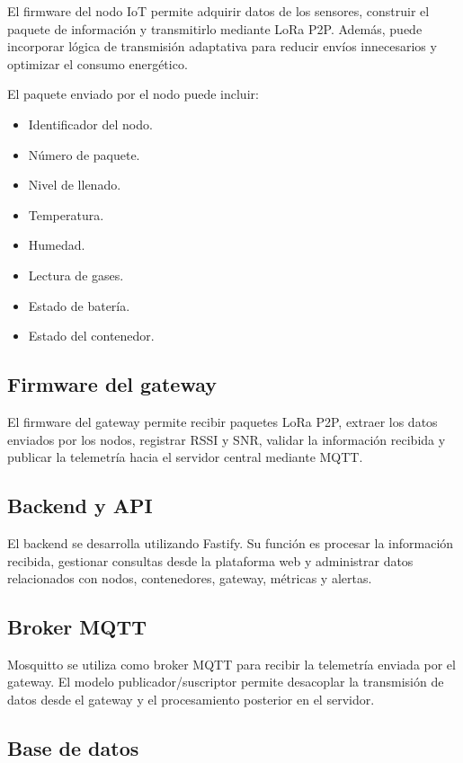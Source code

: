 El firmware del nodo IoT permite adquirir datos de los sensores, construir el paquete de información y transmitirlo mediante LoRa P2P. Además, puede incorporar lógica de transmisión adaptativa para reducir envíos innecesarios y optimizar el consumo energético.

El paquete enviado por el nodo puede incluir:

\begin{itemize}
    \item Identificador del nodo.
    \item Número de paquete.
    \item Nivel de llenado.
    \item Temperatura.
    \item Humedad.
    \item Lectura de gases.
    \item Estado de batería.
    \item Estado del contenedor.
\end{itemize}

\subsection{Firmware del gateway}

El firmware del gateway permite recibir paquetes LoRa P2P, extraer los datos enviados por los nodos, registrar RSSI y SNR, validar la información recibida y publicar la telemetría hacia el servidor central mediante MQTT.

\subsection{Backend y API}

El backend se desarrolla utilizando Fastify. Su función es procesar la información recibida, gestionar consultas desde la plataforma web y administrar datos relacionados con nodos, contenedores, gateway, métricas y alertas.

\subsection{Broker MQTT}

Mosquitto se utiliza como broker MQTT para recibir la telemetría enviada por el gateway. El modelo publicador/suscriptor permite desacoplar la transmisión de datos desde el gateway y el procesamiento posterior en el servidor.

\subsection{Base de datos}

